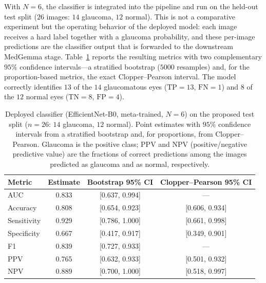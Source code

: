 \documentclass[runningheads]{llncs}
\begin{document}
With $N=6$, the classifier is integrated into the pipeline and run on the held-out test split ($26$ images: $14$ glaucoma, $12$ normal). This is not a comparative experiment but the operating behavior of the deployed model: each image receives a hard label together with a glaucoma probability, and these per-image predictions are the classifier output that is forwarded to the downstream MedGemma stage. Table~\ref{tab:private-metrics} reports the resulting metrics with two complementary $95\%$ confidence intervals---a stratified bootstrap ($5000$ resamples) and, for the proportion-based metrics, the exact Clopper--Pearson interval. The model correctly identifies $13$ of the $14$ glaucomatous eyes ($\mathrm{TP}=13$, $\mathrm{FN}=1$) and $8$ of the $12$ normal eyes ($\mathrm{TN}=8$, $\mathrm{FP}=4$).

\begin{table}[t]
  \centering
  \caption{Deployed classifier (EfficientNet-B0, meta-trained, $N=6$) on the proposed
  test split ($n=26$: $14$ glaucoma, $12$ normal). Point estimates with $95\%$
  confidence intervals from a stratified bootstrap and, for proportions, from
  Clopper--Pearson. Glaucoma is the positive class; PPV and NPV (positive/negative
  predictive value) are the fractions of correct predictions among the images
  predicted as glaucoma and as normal, respectively.}
  \label{tab:private-metrics}
  \begin{tabular}{lccc}
    \toprule
    Metric & Estimate & Bootstrap 95\% CI & Clopper--Pearson 95\% CI \\
    \midrule
    AUC          & 0.833 & [0.637, 0.994] & --- \\
    Accuracy     & 0.808 & [0.654, 0.923] & [0.606, 0.934] \\
    Sensitivity  & 0.929 & [0.786, 1.000] & [0.661, 0.998] \\
    Specificity  & 0.667 & [0.417, 0.917] & [0.349, 0.901] \\
    F1           & 0.839 & [0.727, 0.933] & --- \\
    PPV          & 0.765 & [0.632, 0.933] & [0.501, 0.932] \\
    NPV          & 0.889 & [0.700, 1.000] & [0.518, 0.997] \\
    \bottomrule
  \end{tabular}
\end{table}
\end{document}
